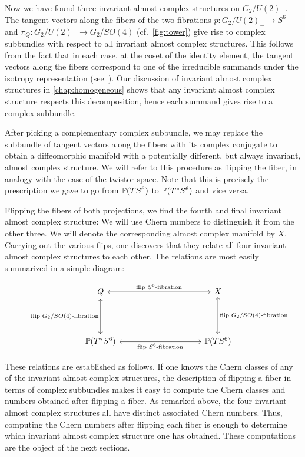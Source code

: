 Now we have found three invariant almost complex structures on $G_2/U(2)_-$. The tangent vectors along the fibers of the two fibrations $p:G_2/U(2)_-\to S^6$ and $\pi_Q:G_2/U(2)_-\to G_2/SO(4)$ (cf.~\cref{fig:tower}) give rise to complex subbundles with respect to all invariant almost complex structures. This follows from the fact that in each case, at the coset of the identity element, the tangent vectors along the fibers correspond to one of the irreducible summands under the isotropy representation (see~\cite[163]{Ker1996}). Our discussion of invariant almost complex structures in \cref{chap:homogeneous} shows that any invariant almost complex structure respects this decomposition, hence each summand gives rise to a complex subbundle.

After picking a complementary complex subbundle, we may replace the subbundle of tangent vectors along the fibers with its complex conjugate to obtain a diffeomorphic manifold with a potentially different, but always invariant, almost complex structure. We will refer to this procedure as flipping the fiber, in analogy with the case of the twistor space. Note that this is precisely the prescription we gave to go from $\P(TS^6)$ to $\P(T^*S^6)$ and vice versa.

Flipping the fibers of both projections, we find the fourth and final invariant almost complex structure: We will use Chern numbers to distinguish it from the other three. We will denote the corresponding almost complex manifold by $X$. Carrying out the various flips, one discovers that they relate all four invariant almost complex structures to each other. The relations are most easily summarized in a simple diagram:

\begin{figure}[ht!]
	\begin{equation*}
		\begin{tikzcd}[column sep=3.5cm,row sep=1.5cm]
			Q \ar[r,leftrightarrow,"\text{flip }S^6\text{-fibration}"] 
			\ar[d,leftrightarrow,"\text{flip }G_2/SO(4)\text{-fibration}"']
			& X \ar[d,leftrightarrow,"\text{flip }G_2/SO(4)\text{-fibration}"]\\
			\P(T^*S^6) \ar[r,leftrightarrow,"\text{flip }S^6\text{-fibration}"']
			& \P(TS^6)
		\end{tikzcd}
	\end{equation*}
	\caption{}\label{fig:Qfliprelations}
\end{figure}

These relations are established as follows. If one knows the Chern classes of any of the invariant almost complex structures, the description of flipping a fiber in terms of complex subbundles makes it easy to compute the Chern classes and numbers obtained after flipping a fiber. As remarked above, the four invariant almost complex structures all have distinct associated Chern numbers. Thus, computing the Chern numbers after flipping each fiber is enough to determine which invariant almost complex structure one has obtained. These computations are the object of the next sections.

